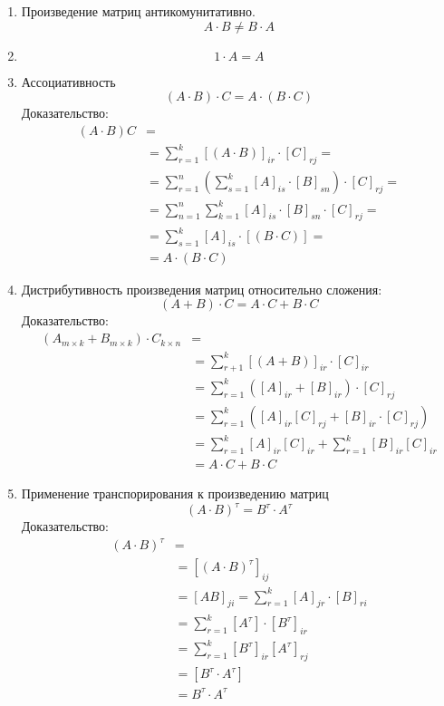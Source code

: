 \begin{enumerate}
  \item Произведение матриц антикомунитативно. \[
  A \cdot  B \neq  B \cdot A
  \] 
  \item \[
  1 \cdot A = A
  \] 

  \item Ассоциативность \[
      (A \cdot B) \cdot C = A \cdot (B \cdot C)
  \]
  Доказательство:
  \begin{align*}
    \left( A \cdot  B \right) C &= \\
    &= \sum_{r=1}^{k} [(A \cdot B)]_{ir} \cdot [C]_{rj} = \\
    &= \sum_{r=1}^{n} \left( \sum_{s=1}^{k} [A]_{is} \cdot [B]_{sn} \right) \cdot [C]_{rj} = \\
    &= \sum_{n=1}^{n} \sum_{k=1}^{k} [A]_{is} \cdot [B]_{sn} \cdot [C]_{rj} = \\
    &= \sum_{s=1}^{k} [A]_{is} \cdot  [\left( B \cdot C \right) ] =\\
    &= A \cdot (B \cdot C)
  \end{align*}

  \item Дистрибутивность произведения матриц относительно сложения: \[
      (A + B) \cdot C = A \cdot C + B \cdot C
  \] 
  Доказательство:
  \begin{align*}
    \left(A_{m \times k} + B_{m \times k}\right) \cdot C_{k \times n} &= \\
    &= \sum_{r+1}^{k} [\left( A + B \right) ]_{ir} \cdot [C]_{ir} \\
    &= \sum_{r=1}^{k} \left( [A]_{ir} + [B]_{ir} \right) \cdot [C]_{rj} \\
    &= \sum_{r=1}^{k} \left( [A]_{ir} [C]_{rj} + [B]_{ir} \cdot [C]_{rj} \right) \\
    &= \sum_{r=1}^{k} [A]_{ir} [C]_{ir} + \sum_{r=1}^{k} [B]_{ir} [C]_{ir} \\
    &= A \cdot C + B \cdot C
  \end{align*}

\item Применение транспорирования к произведению матриц \[
      (A \cdot B)^\tau = B^\tau \cdot A^\tau
  \]  
  Доказательство:
  \begin{align*}
    \left( A \cdot B \right)^\tau &= \\
    &= [ \left( A \cdot B \right)^\tau ]_{ij} \\
    &= [A B]_{ji} = \sum_{r=1}^{k} [A]_{jr} \cdot [B]_{ri} \\
    &= \sum_{r=1}^{k} [A^\tau] \cdot  [B^\tau]_{ir} \\
    &= \sum_{r=1}^{k} [B^\tau]_{ir} [A^\tau]_{rj} \\
    &= [B^\tau \cdot A^\tau] \\
    &=B^\tau \cdot A^\tau
  \end{align*}
\end{enumerate}

